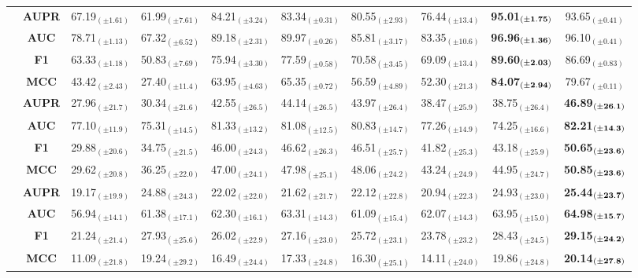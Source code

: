 \begin{table}[t]
\begin{tabular*}{\textwidth}{@{\extracolsep{\fill}} l |c | ccccccc | >{\columncolor{FireBrick!40}}c }
\addlinespace    
\cmidrule{1-10}

\multirow{4}{*}{\bf XC} & \bf AUPR & 67.19$_{(\pm1.61)}$ & 61.99$_{(\pm7.61)}$ & 84.21$_{(\pm3.24)}$ & 83.34$_{(\pm0.31)}$ & 80.55$_{(\pm2.93)}$ & 76.44$_{(\pm13.4)}$ & \bf 95.01$_{(\bf\pm1.75)}$ & 93.65$_{(\pm0.41)}$ \\
& \bf AUC & 78.71$_{(\pm1.13)}$ & 67.32$_{(\pm6.52)}$ & 89.18$_{(\pm2.31)}$ & 89.97$_{(\pm0.26)}$ & 85.81$_{(\pm3.17)}$ & 83.35$_{(\pm10.6)}$ & \bf 96.96$_{(\bf\pm1.36)}$ & 96.10$_{(\pm0.41)}$ \\
 & \bf F1 & 63.33$_{(\pm1.18)}$ & 50.83$_{(\pm7.69)}$ & 75.94$_{(\pm3.30)}$ & 77.59$_{(\pm0.58)}$ & 70.58$_{(\pm3.45)}$ & 69.09$_{(\pm13.4)}$ & \bf 89.60$_{(\bf\pm2.03)}$ & 86.69$_{(\pm0.83)}$ \\
 & \bf MCC  & 43.42$_{(\pm2.43)}$ & 27.40$_{(\pm11.4)}$ & 63.95$_{(\pm4.63)}$ & 65.35$_{(\pm0.72)}$ & 56.59$_{(\pm4.89)}$ & 52.30$_{(\pm21.3)}$ & \bf 84.07$_{(\bf\pm2.94)}$ & 79.67$_{(\pm0.11)}$ \\


\addlinespace    
\midrule

 \multirow{4}{*}{\bf SMD} & \bf AUPR & 27.96$_{(\pm21.7)}$ & 30.34$_{(\pm21.6)}$ & 42.55$_{(\pm26.5)}$ & 44.14$_{(\pm26.5)}$ & 43.97$_{(\pm26.4)}$ & 38.47$_{(\pm25.9)}$ & 38.75$_{(\pm26.4)}$ & \bf 46.89$_{(\bf\pm26.1)}$ \\
 & \bf AUC & 77.10$_{(\pm11.9)}$ & 75.31$_{(\pm14.5)}$ & 81.33$_{(\pm13.2)}$ & 81.08$_{(\pm12.5)}$ & 80.83$_{(\pm14.7)}$ & 77.26$_{(\pm14.9)}$ & 74.25$_{(\pm16.6)}$ & \bf 82.21$_{(\bf\pm14.3)}$ \\
 & \bf F1 & 29.88$_{(\pm20.6)}$ & 34.75$_{(\pm21.5)}$ & 46.00$_{(\pm24.3)}$ & 46.62$_{(\pm26.3)}$ & 46.51$_{(\pm25.7)}$ & 41.82$_{(\pm25.3)}$ & 43.18$_{(\pm25.9)}$ & \bf 50.65$_{(\bf\pm23.6)}$ \\
 & \bf MCC & 29.62$_{(\pm20.8)}$ & 36.25$_{(\pm22.0)}$ & 47.00$_{(\pm24.1)}$ & 47.98$_{(\pm25.1)}$ & 48.06$_{(\pm24.2)}$ & 43.24$_{(\pm24.9)}$ & 44.95$_{(\pm24.7)}$ & \bf 50.85$_{(\bf\pm23.6)}$ \\
\addlinespace    
\cmidrule{1-10}

 \multirow{4}{*}{\bf MSL} & \bf AUPR & 19.17$_{(\pm19.9)}$ & 24.88$_{(\pm24.3)}$ & 22.02$_{(\pm22.0)}$ & 21.62$_{(\pm21.7)}$ & 22.12$_{(\pm22.8)}$ & 20.94$_{(\pm22.3)}$ & 24.93$_{(\pm23.0)}$ & \bf 25.44$_{(\bf\pm23.7)}$ \\
 & \bf AUC & 56.94$_{(\pm14.1)}$ & 61.38$_{(\pm17.1)}$ & 62.30$_{(\pm16.1)}$ & 63.31$_{(\pm14.3)}$ & 61.09$_{(\pm15.4)}$ & 62.07$_{(\pm14.3)}$ & 63.95$_{(\pm15.0)}$ & \bf 64.98$_{(\bf\pm15.7)}$ \\
 & \bf F1 & 21.24$_{(\pm21.4)}$ & 27.93$_{(\pm25.6)}$ & 26.02$_{(\pm22.9)}$ & 27.16$_{(\pm23.0)}$ & 25.72$_{(\pm23.1)}$ & 23.78$_{(\pm23.2)}$ & 28.43$_{(\pm24.5)}$ & \bf 29.15$_{(\bf\pm24.2)}$ \\
 & \bf MCC & 11.09$_{(\pm21.8)}$ & 19.24$_{(\pm29.2)}$ & 16.49$_{(\pm24.4)}$ & 17.33$_{(\pm24.8)}$ & 16.30$_{(\pm25.1)}$ & 14.11$_{(\pm24.0)}$ & 19.86$_{(\pm24.8)}$ & \bf 20.14$_{(\bf\pm27.8)}$ \\


\end{tabular*}
\end{table}
